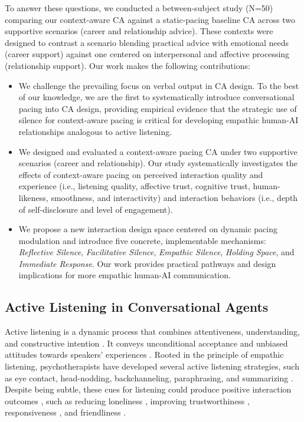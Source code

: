 To answer these questions, we conducted a between-subject study (N=50) comparing our context-aware CA against a static-pacing baseline CA across two supportive scenarios (career and relationship advice). 
These contexts were designed to contrast a scenario blending practical advice with emotional needs (career support) against one centered on interpersonal and affective processing (relationship support). Our work makes the following contributions:

\begin{itemize}
    \item We challenge the prevailing focus on verbal output in CA design. To the best of our knowledge, we are the first to systematically introduce conversational pacing into CA design, providing empirical evidence that the strategic use of silence for context-aware pacing is critical for developing empathic human-AI relationships analogous to active listening.
    \item We designed and evaluated a context-aware pacing CA under two supportive scenarios (career and relationship). Our study systematically investigates the effects of context-aware pacing on perceived interaction quality and experience (i.e., listening quality, affective trust, cognitive trust, human-likeness, smoothness, and interactivity) and interaction behaviors (i.e., depth of self-disclosure and level of engagement).
    \item We propose a new interaction design space centered on dynamic pacing modulation and introduce five concrete, implementable mechanisms: \emph{Reflective Silence}, \emph{Facilitative Silence}, \emph{Empathic Silence}, \emph{Holding Space}, and \emph{Immediate Response}. Our work provides practical pathways and design implications for more empathic human-AI communication.
\end{itemize}

\subsection{Active Listening in Conversational Agents}
\label{sec:related_work_active}
Active listening is a dynamic process that combines attentiveness, understanding, and constructive intention \cite{kluger2022power}. It conveys unconditional acceptance and unbiased attitudes towards speakers' experiences \cite{rogers1959theory}. Rooted in the principle of empathic listening, psychotherapists have developed several active listening strategies, such as eye contact, head-nodding, backchanneling, paraphrasing, and summarizing \cite{weger2010active, 10.1145/3706598.3714228}. Despite being subtle, these cues for listening could produce positive interaction outcomes \cite{weger2014relative}, such as reducing loneliness \cite{itzchakov2023connection}, improving trustworthiness \cite{ramsey1997listening}, responsiveness \cite{itzchakov2022foster}, and friendliness \cite{bodie2012listening}.

